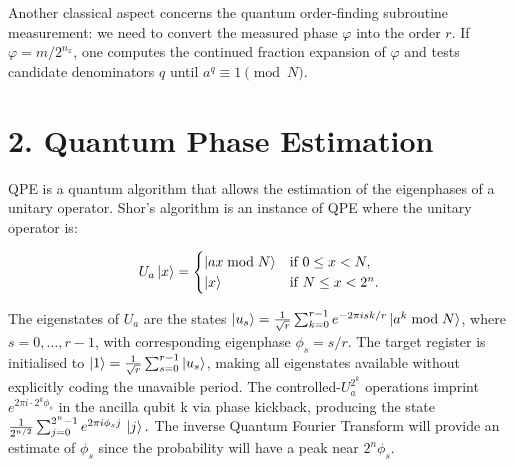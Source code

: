 \documentclass[11pt,a4paper]{article}
\begin{document}
Another classical aspect concerns the quantum order-finding subroutine measurement: we 
need to convert the measured phase $\varphi$ into the order $r$.
If $\varphi = m/2^{n_x}$,
one computes the continued fraction expansion of $\varphi$ and tests candidate denominators
$q$ until $a^q \equiv 1 \pmod{N}$.


\section{2. Quantum Phase Estimation}

QPE is a quantum algorithm that allows the estimation of the eigenphases of a unitary operator. Shor's algorithm is an instance of QPE where the unitary operator is:

\begin{equation}
  U_a \ket{x} = \begin{cases}
  \ket{a x \bmod N} & \text{if } 0 \leq x < N,\\
  \ket{x} & \text{if } N \leq x < 2^n.
  \end{cases}
\end{equation}

The eigenstates of $U_a$ are the states $\ket{u_s} = \frac{1}{\sqrt{r}} \sum_{k=0}^{r-1} e^{-2\pi i s k / r} \ket{a^k \bmod N}$, where $s=0,\ldots,r-1$, with corresponding eigenphase $\phi_s = s/r$. 
The target register is initialised to $\ket{1} = \frac{1}{\sqrt{r}}\sum_{s=0}^{r-1}\ket{u_s}$, making all eigenstates available without explicitly coding the unavaible period.
The controlled-$U_a^{2^k}$ operations imprint $e^{2\pi i \cdot 2^k \phi_s}$ in the ancilla qubit k via phase kickback, producing the state
$
\frac{1}{2^{n/2}}\sum_{j=0}^{2^n-1} e^{2\pi i \phi_s j}\,\ket{j}.
$
The inverse Quantum Fourier Transform will provide an estimate of $\phi_s$ since the probability will have
a peak near $2^n \phi_s$.
\end{document}
